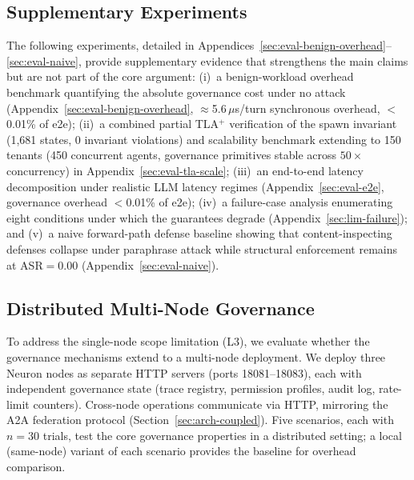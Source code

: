 \subsection{Supplementary Experiments}
\label{sec:eval-supplementary}

The following experiments, detailed in Appendices~\ref{sec:eval-benign-overhead}--\ref{sec:eval-naive},
provide supplementary evidence that strengthens the main claims but
are not part of the core argument: (i)~a benign-workload overhead
benchmark quantifying the absolute governance cost under no attack
(Appendix~\ref{sec:eval-benign-overhead}, $\approx$5.6\,$\mu$s/turn
synchronous overhead, $<$0.01\% of e2e); (ii)~a combined partial
TLA$^+$ verification of the spawn invariant (1{,}681 states, 0
invariant violations) and scalability benchmark extending to 150
tenants (450 concurrent agents, governance primitives stable across
$50\times$ concurrency) in Appendix~\ref{sec:eval-tla-scale};
(iii)~an end-to-end latency decomposition under realistic LLM latency
regimes (Appendix~\ref{sec:eval-e2e}, governance overhead $<$0.01\%
of e2e); (iv)~a failure-case analysis enumerating eight conditions
under which the guarantees degrade (Appendix~\ref{sec:lim-failure});
and (v)~a naive forward-path defense baseline showing that
content-inspecting defenses collapse under paraphrase attack while
structural enforcement remains at ASR$=0.00$
(Appendix~\ref{sec:eval-naive}).

\subsection{Distributed Multi-Node Governance}
\label{sec:eval-distributed}

To address the single-node scope limitation (L3), we evaluate whether the
governance mechanisms extend to a multi-node deployment. We deploy three
Neuron nodes as separate HTTP servers (ports 18081--18083), each with
independent governance state (trace registry, permission profiles, audit
log, rate-limit counters). Cross-node operations communicate via HTTP,
mirroring the A2A federation protocol (Section~\ref{sec:arch-coupled}).
Five scenarios, each with $n=30$ trials, test the core governance
properties in a distributed setting; a local (same-node) variant of each
scenario provides the baseline for overhead comparison.

